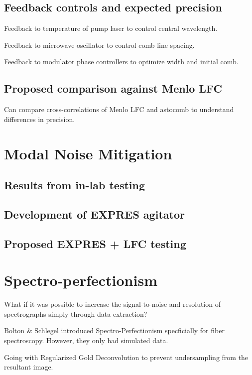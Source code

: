 \documentclass[11pt]{article}
\begin{document}
\subsection{Feedback controls and expected precision}

Feedback to temperature of pump laser to control central wavelength.

Feedback to microwave oscillator to control comb line spacing.

Feedback to modulator phase controllers to optimize width and initial comb.

\subsection{Proposed comparison against Menlo LFC}

Can compare cross-correlations of Menlo LFC and astocomb to understand differences in precision.


\section{Modal Noise Mitigation}
\label{sec:modal_noise}



\subsection{Results from in-lab testing}

\subsection{Development of EXPRES agitator}

\subsection{Proposed EXPRES + LFC testing}

\section{Spectro-perfectionism}
\label{sec:spec_perf}

What if it was possible to increase the signal-to-noise and resolution of spectrographs simply through data extraction?

Bolton \& Schlegel introduced Spectro-Perfectionism specficially for fiber spectroscopy. However, they only had simulated data.

Going with Regularized Gold Deconvolution to prevent undersampling from the resultant image.
\end{document}
